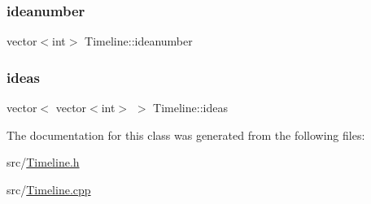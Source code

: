 \mbox{\label{classTimeline_a80c4c6c36d9700788e2d3bb6755b6320}} 
\subsubsection{\texorpdfstring{ideanumber}{ideanumber}}
{\footnotesize\ttfamily vector$<$int$>$ Timeline\+::ideanumber\hspace{0.3cm}{\ttfamily [private]}}

\mbox{\label{classTimeline_a74b605f174f47ea189b2ba88fe9c92f1}} 
\subsubsection{\texorpdfstring{ideas}{ideas}}
{\footnotesize\ttfamily vector$<$ vector$<$int$>$ $>$ Timeline\+::ideas\hspace{0.3cm}{\ttfamily [private]}}



The documentation for this class was generated from the following files\+:\begin{DoxyCompactItemize}
\item 
src/\hyperlink{Timeline_8h}{Timeline.\+h}\item 
src/\hyperlink{Timeline_8cpp}{Timeline.\+cpp}\end{DoxyCompactItemize}
